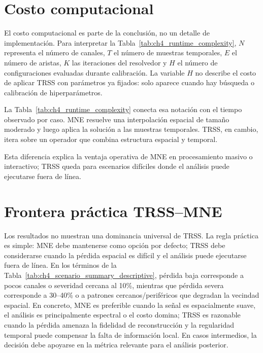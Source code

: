 \FloatBarrier

\section{Costo computacional}
\label{sec:cap4_costo}

El costo computacional es parte de la conclusión, no un detalle de implementación. Para interpretar la Tabla~\ref{tab:ch4_runtime_complexity}, $N$ representa el número de canales, $T$ el número de muestras temporales, $E$ el número de aristas, $K$ las iteraciones del resolvedor y $H$ el número de configuraciones evaluadas durante calibración. La variable $H$ no describe el costo de aplicar TRSS con parámetros ya fijados: solo aparece cuando hay búsqueda o calibración de hiperparámetros.

La Tabla~\ref{tab:ch4_runtime_complexity} conecta esa notación con el tiempo observado por caso. MNE resuelve una interpolación espacial de tamaño moderado y luego aplica la solución a las muestras temporales. TRSS, en cambio, itera sobre un operador que combina estructura espacial y temporal.



Esta diferencia explica la ventaja operativa de MNE en procesamiento masivo o interactivo; TRSS queda para escenarios difíciles donde el análisis puede ejecutarse fuera de línea.

\FloatBarrier

\section{Frontera práctica TRSS--MNE}

Los resultados no muestran una dominancia universal de TRSS. La regla práctica es simple: MNE debe mantenerse como opción por defecto; TRSS debe considerarse cuando la pérdida espacial es difícil y el análisis puede ejecutarse fuera de línea. En los términos de la Tabla~\ref{tab:ch4_scenario_summary_descriptive}, pérdida baja corresponde a pocos canales o severidad cercana al 10\%, mientras que pérdida severa corresponde a 30--40\% o a patrones cercanos/periféricos que degradan la vecindad espacial. En concreto, MNE es preferible cuando la señal es espacialmente suave, el análisis es principalmente espectral o el costo domina; TRSS es razonable cuando la pérdida amenaza la fidelidad de reconstrucción y la regularidad temporal puede compensar la falta de información local. En casos intermedios, la decisión debe apoyarse en la métrica relevante para el análisis posterior.
